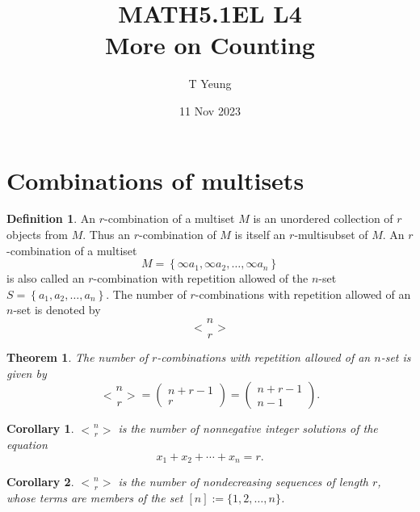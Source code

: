 \documentclass{exam}
\title{MATH5.1EL L4 \\ More on Counting}
\author{T Yeung}
\date{11 Nov 2023}
\newtheorem{theorem}{Theorem}[section]
\newtheorem{corollary}{Corollary}[theorem]
\theoremstyle{definition}
\newtheorem{defn}{Definition}[section]
\theoremstyle{definition}
\theoremstyle{definition}
\newcommand{\hbinom}[2]{\genfrac{<}{>}{0pt}{}{#1}{#2}}
\begin{document}
\maketitle

\noindent
{}
\vspace{0.3in}

\section{Combinations of multisets}
\begin{defn}
	
An $r$-combination of a multiset $M$ is an unordered collection of $r$ objects from $M$. Thus an $r$-combination of $M$ is itself an $r$-multisubset of $M$. An $r$-combination of a multiset
$$
M=\left\{\infty a_1, \infty a_2, \ldots, \infty a_n\right\}
$$
is also called an $r$-combination with repetition allowed of the $n$-set $S=\left\{a_1, a_2, \ldots, a_n\right\}$. The number of $r$-combinations with repetition allowed of an $n$-set is denoted by
\begin{equation*}
	\hbinom{n}{r}
\end{equation*}
\end{defn}

\begin{theorem}
	
The number of $r$-combinations with repetition allowed of an $n$-set is given by
$$
\hbinom{n}{r}
=\left(\begin{array}{c}
n+r-1 \\
r
\end{array}\right)=\left(\begin{array}{c}
n+r-1 \\
n-1
\end{array}\right) .
$$
\end{theorem}

\begin{corollary}
$\hbinom{n}{r}$ is the number of nonnegative integer solutions of the equation
$$
x_1+x_2+\cdots+x_n=r .
$$
\end{corollary}

\begin{corollary}
	$\hbinom{n}{r}$ is the number of nondecreasing sequences of length $r$, whose terms are members of the set $[n]:=\{1,2, \ldots, n\}$.
\end{corollary}
\end{document}

